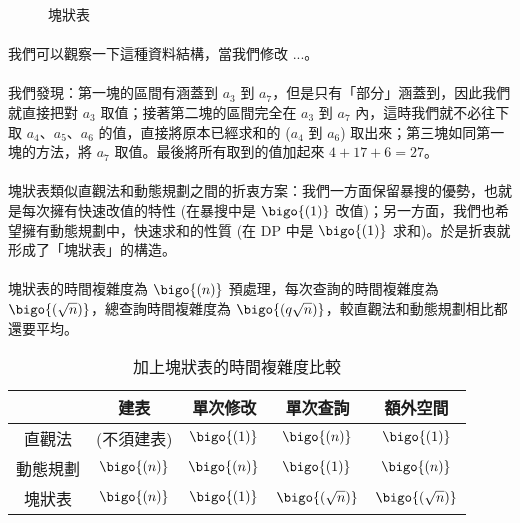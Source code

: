 \documentclass[12pt,a4paper,oneside]{report}
\begin{document}
\begin{CJK}{UTF8}{bkai}
\begin{figure}[h]
\caption{塊狀表}
\label{tree:fig:rsq:block}
\end{figure}

\paragraph{}我們可以觀察一下這種資料結構，當我們修改 ...。

\paragraph{}我們發現：第一塊的區間有涵蓋到 $a_3$ 到 $a_7$，但是只有「部分」涵蓋到，因此我們就直接把對 $a_3$ 取值；接著第二塊的區間完全在 $a_3$ 到 $a_7$ 內，這時我們就不必往下取 $a_4$、$a_5$、$a_6$ 的值，直接將原本已經求和的 ($a_4$ 到 $a_6$) 取出來；第三塊如同第一塊的方法，將 $a_7$ 取值。最後將所有取到的值加起來 $4+17+6=27$。

\paragraph{}塊狀表類似直觀法和動態規劃之間的折衷方案：我們一方面保留暴搜的優勢，也就是每次擁有快速改值的特性 (在暴搜中是 $\bigo{(1)}$ 改值)；另一方面，我們也希望擁有動態規劃中，快速求和的性質 (在 DP 中是 $\bigo{(1)}$ 求和)。於是折衷就形成了「塊狀表」的構造。

\paragraph{}塊狀表的時間複雜度為 $\bigo{(n)}$ 預處理，每次查詢的時間複雜度為 $\bigo{(\sqrt{n})}$，總查詢時間複雜度為 $ \bigo{(q\sqrt{n})}$，較直觀法和動態規劃相比都還要平均。

\begin{table}[h]
\centering
\begin{tabular}{c|cccc}
& 建表 & 單次修改 & 單次查詢 & 額外空間\\
\hline
\hline
直觀法 & (不須建表) & $\bigo{(1)}$ & $\bigo{(n)}$ & $\bigo{(1)}$\\
動態規劃 & $\bigo{(n)}$ & $\bigo{(n)}$ & $\bigo{(1)}$ & $\bigo{(n)}$\\
塊狀表 & $\bigo{(n)}$ & $\bigo{(1)}$ & $\bigo{(\sqrt{n})}$ & $\bigo{(\sqrt{n})}$
\end{tabular}
\caption{加上塊狀表的時間複雜度比較}
\label{tree:tab:rsq:block:time}
\end{table}


\end{CJK}
\end{document}
